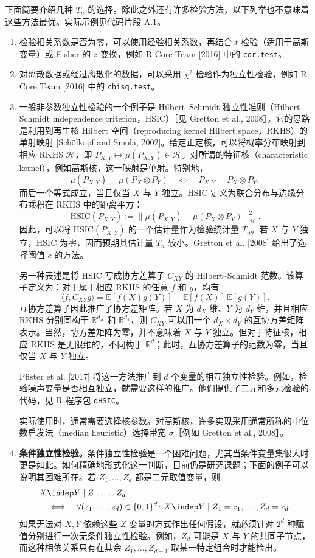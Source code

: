 下面简要介绍几种 $T_n$ 的选择。除此之外还有许多检验方法，以下列举也不意味着这些方法最优。实际示例见代码片段 A.1。
\begin{enumerate}[label=(\roman*)]
\item 检验相关系数是否为零，可以使用经验相关系数，再结合 $t$ 检验（适用于高斯变量）或 Fisher 的 $z$ 变换，例如 R Core Team [2016] 中的 \texttt{cor.test}。
\item 对离散数据或经过离散化的数据，可以采用 $\chi^2$ 检验作为独立性检验，例如 R Core Team [2016] 中的 \texttt{chisq.test}。
\item 一般非参数独立性检验的一个例子是 Hilbert--Schmidt 独立性准则（Hilbert--Schmidt independence criterion，HSIC）［见 Gretton et al., 2008］。它的思路是利用到再生核 Hilbert 空间（reproducing kernel Hilbert space，RKHS）的单射映射 [Schölkopf and Smola, 2002]。给定正定核，可以将概率分布映射到相应 RKHS $\mathcal H$，即 $P_{X,Y}\mapsto\mu(P_{X,Y})\in\mathcal H$。对所谓的特征核（characteristic kernel），例如高斯核，这一映射是单射。特别地，
\[\mu(P_{X,Y})=\mu(P_X\otimes P_Y)\quad\Longleftrightarrow\quad P_{X,Y}=P_X\otimes P_Y,\]
而后一个等式成立，当且仅当 $X$ 与 $Y$ 独立。HSIC 定义为联合分布与边缘分布乘积在 RKHS 中的距离平方：
\[\mathrm{HSIC}(P_{X,Y}):=\lVert\mu(P_{X,Y})-\mu(P_X\otimes P_Y)\rVert_{\mathcal H}^2.\]
因此，可以将 $\mathrm{HSIC}(P_{X,Y})$ 的一个估计量作为检验统计量 $T_n$。若 $X$ 与 $Y$ 独立，HSIC 为零，因而预期其估计量 $T_n$ 较小。Gretton et al. [2008] 给出了选择阈值 $c$ 的方法。

另一种表述是将 HSIC 写成协方差算子 $C_{XY}$ 的 Hilbert--Schmidt 范数。该算子定义为：对于属于相应 RKHS 的任意 $f$ 和 $g$，均有
\[\langle f,C_{XY}g\rangle=\mathbb E[f(X)g(Y)]-\mathbb E[f(X)]\,\mathbb E[g(Y)].\]
互协方差算子因此推广了协方差矩阵。若 $X$ 为 $d_X$ 维、$Y$ 为 $d_Y$ 维，并且相应 RKHS 分别同构于 $\mathbb R^{d_X}$ 和 $\mathbb R^{d_Y}$，则 $C_{XY}$ 可以用一个 $d_X\times d_Y$ 的互协方差矩阵表示。当然，协方差矩阵为零，并不意味着 $X$ 与 $Y$ 独立。但对于特征核，相应 RKHS 是无限维的，不同构于 $\mathbb R^d$；此时，互协方差算子的范数为零，当且仅当 $X$ 与 $Y$ 独立。

Pfister et al. [2017] 将这一方法推广到 $d$ 个变量的相互独立性检验。例如，检验噪声变量是否相互独立，就需要这样的推广。他们提供了二元和多元检验的代码，见 R 程序包 \texttt{dHSIC}。

实际使用时，通常需要选择核参数。对高斯核，许多实现采用通常所称的中位数启发法（median heuristic）选择带宽 $\sigma$［例如 Gretton et al., 2008］。
\item \textbf{条件独立性检验。}条件独立性检验是一个困难问题，尤其当条件变量集很大时更是如此。如何精确地形式化这一判断，目前仍是研究课题；下面的例子可以说明其困难所在。若 $Z_1,\ldots,Z_d$ 都是二元取值变量，则
\[\begin{aligned}
&X\indep Y\mid Z_1,\ldots,Z_d\\
&\quad\Longleftrightarrow\quad
\forall(z_1,\ldots,z_d)\in\{0,1\}^d\colon
X\indep Y\mid Z_1=z_1,\ldots,Z_d=z_d.
\end{aligned}\]
如果无法对 $X,Y$ 依赖这些 $Z$ 变量的方式作出任何假设，就必须针对 $2^d$ 种赋值分别进行一次无条件独立性检验。例如，$Z_d$ 可能是 $X$ 与 $Y$ 的共同子节点，而这种相依关系只有在其余 $Z_1,\ldots,Z_{d-1}$ 取某一特定组合时才能检出。


\end{enumerate}

